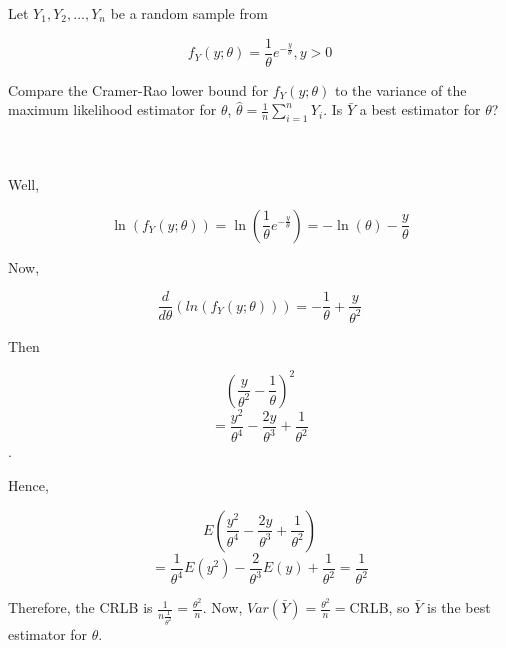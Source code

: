 Let $Y_1,Y_2,\ldots,Y_n$ be a random sample from

$$f_Y(y;\theta)=\frac{1}{\theta}e^{-\frac{y}{\theta}}, y>0$$

Compare the Cramer-Rao lower bound for $f_Y(y;\theta)$ to the variance of the maximum likelihood
estimator for $\theta$, $\hat{\theta}=\frac1n\sum_{i=1}^nY_i$. Is $\bar{Y}$ a best estimator for
$\theta$?\\\\

\begin{solution}\renewcommand{\qedsymbol}{}\ \\
    Well,
    
    $$\ln(f_Y(y;\theta))=\ln(\frac{1}{\theta}e^{-\frac{y}{\theta}})=-\ln(\theta)-\frac{y}{\theta}$$

    Now,
    
    $$\frac{d}{d\theta}(ln(f_Y(y;\theta)))=-\frac{1}{\theta}+\frac{y}{\theta^2}$$
    
    Then
    
    $$(\frac{y}{\theta^2}-\frac{1}{\theta})^2$$
    $$=\frac{y^2}{\theta^4}-\frac{2y}{\theta^3}+\frac{1}{\theta^2}$$.
    
    Hence,
    
    $$E(\frac{y^2}{\theta^4}-\frac{2y}{\theta^3}+\frac{1}{\theta^2})$$
    $$=\frac{1}{\theta^4}E(y^2)-\frac{2}{\theta^3}E(y)+\frac{1}{\theta^2}=\frac{1}{\theta^2}$$
    
    Therefore, the CRLB is $\frac{1}{n\frac{1}{\theta^2}}=\frac{\theta^2}{n}$. Now,
    $Var(\bar{Y})=\frac{\theta^2}{n}=$CRLB, so $\bar{Y}$ is the best estimator for $\theta$.

\end{solution}